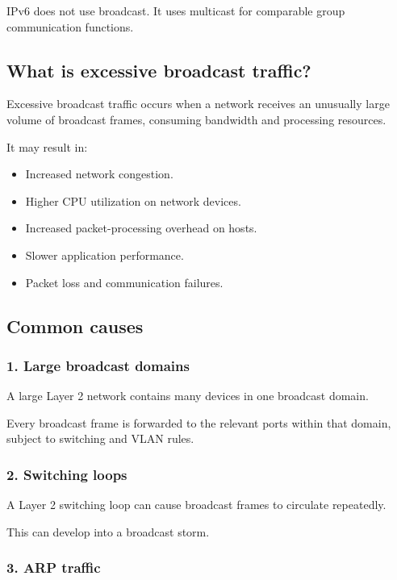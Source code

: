 IPv6 does not use broadcast. It uses multicast for comparable group communication functions.

\subsection{What is excessive broadcast traffic?}

Excessive broadcast traffic occurs when a network receives an unusually large volume of broadcast frames, consuming bandwidth and processing resources.

It may result in:

\begin{itemize}
\item Increased network congestion.
\item Higher CPU utilization on network devices.
\item Increased packet-processing overhead on hosts.
\item Slower application performance.
\item Packet loss and communication failures.
\end{itemize}

\subsection{Common causes}

\subsubsection{1. Large broadcast domains}

A large Layer 2 network contains many devices in one broadcast domain.

Every broadcast frame is forwarded to the relevant ports within that domain, subject to switching and VLAN rules.

\subsubsection{2. Switching loops}

A Layer 2 switching loop can cause broadcast frames to circulate repeatedly.

This can develop into a broadcast storm.

\subsubsection{3. ARP traffic}

